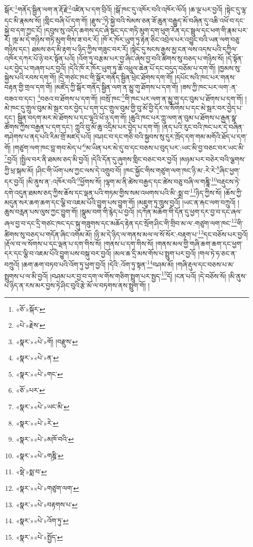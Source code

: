 སྒོར་\footnote{«ཅོ་»སྐོར་}གནོད་སྦྱིན་ལག་ན་རྡོ་རྗེ་\footnote{«པེ་»རྗེས་}འཛིན་པ་དག་བྲིའོ། །སྒོ་ཁང་དུ་འཁོར་བའི་འཁོར་ལོའོ། །ཆ་ལྔ་པར་བྱའོ། །སྟེང་དུ་ལྷ་དང་མི་རྣམས་སོ། །གླིང་བཞི་པོ་དག་གོ། །རྫུས་\footnote{«སྣར་»«པེ་»གོ། །བརྫུས་}ཏེ་སྐྱེ་བའི་སེམས་ཅན་ཟོ་ཆུན་བརྒྱུད་མོ་བཞིན་དུ་འཆི་འཕོ་བ་དང་སྐྱེ་བ་དག་ཀྱང་ངོ། །དབུས་སུ་འདོད་ཆགས་དང་ཞེ་སྡང་དང་གཏི་མུག་དག་ཕུག་རོན་དང་སྦྲུལ་དང་ཕག་གི་རྣམ་པར་རོ། །སྔ་མ་དེ་གཉིས་གཏི་མུག་གིས་ཟ་བར་རོ། །ཁོ་ར་ཁོར་ཡུག་ཏུ་རྟེན་ཅིང་འབྲེལ་པར་འབྱུང་བའི་ཡན་ལག་བཅུ་གཉིས་དང་། ཐམས་ཅད་མི་རྟག་པ་ཉིད་ཀྱིས་གཟུང་བར་རོ། །སྟེང་དུ་སངས་རྒྱས་མྱ་ངན་ལས་འདས་པའི་དཀྱིལ་འཁོར་དཀར་པོ་ཉེ་བར་སྟོན་པའོ། །འོག་ཏུ་བརྩམ་པར་བྱ་ཞིང་ཞེས་བྱ་བའི་ཚིགས་སུ་བཅད་པ་གཉིས་སོ། །དེ་སྟོན་པར་བྱེད་པ་གཞག་པར་བྱའོ། །དེའི་ཁོ་ར་ཁོར་ཡུག་ཏུ་ཆོ་འཕྲུལ་ཆེན་པོ་དང་བདུད་བཅོམ་པ་དག་གོ། །ཁྱམས་སུ་སྐྱེས་པའི་རབས་དག་གོ། །དྲི་གཙང་ཁང་གི་སྒོར་གནོད་སྦྱིན་ཕྲེང་ཐོགས་དག་གོ། །དཔོང་སའི་ཁང་པར་གནས་བརྟན་གྱི་གྲལ་དག་གོ། །མཛོད་ཀྱི་སྒོར་གནོད་སྦྱིན་ལག་ན་མྱུ་གུ་ཐོགས་པ་དག་གོ། །ཟས་ཀྱི་ཁང་པར་ལག་:ན་བཟའ་བ་དང་། \footnote{«སྣར་»«པེ་»ན་}བཅའ་བ་ཐོགས་པ་དག་གོ། །བསྲོ་ཁང་\footnote{«སྣར་»«པེ་»གང་}གི་ཁང་པར་ལག་ན་མྱུ་གུ་དང་བུམ་པ་ཐོགས་པ་དག་གོ། །མེ་ཁང་དུ་གྲུལ་བུམ་མེ་སྦར་བར་བྱེད་པ་དག་དང་གྲུལ་བུམ་གྱི་བུ་མོ་བྱི་དོར་ལ་སོགས་པ་དང་མེ་སྦར་བར་བྱེད་པ་དང་། སྦྱིན་བདག་མར་མེ་ཐོགས་པ་དང་ལྷའི་ཕོ་ཉ་དག་གོ། །ཆུའི་ཁང་པར་ཀླུ་ལག་ན་བུམ་པ་ཐོགས་པ་རྒྱན་སྣ་ཚོགས་ཀྱིས་བརྒྱན་པ་དག་དང་། ཀླུའི་བུ་མོ་ཆུ་འདྲིམ་པར་བྱེད་པ་དག་གོ། །ནད་པའི་རུང་བའི་ཁང་པར་དེ་བཞིན་གཤེགས་པ་ནད་པའི་རིམ་གྲོ་མཛད་པའོ། །བཤང་བ་དང་གཅི་བའི་སྐྱབས་སུ་དུར་ཁྲོད་དག་གམ་མགོའི་ཐོད་པ་དག་གོ། །གཙུག་ལག་ཁང་བླ་གབ་མེད་པ་\footnote{«ཅོ་»པར་}མ་ཡིན་པར་མེ་དུ་བ་དང་བཅས་པ་བུད་པར་:ཡང་མི་བྱ་བཅང་བར་ཡང་མི་\footnote{«སྣར་»«པེ་»ཡང་མི་}བྱའོ། །སྤྱིལ་བར་ནི་ཐམས་ཅད་མི་བྱའོ། །དེའི་དོན་དུ་ཞུགས་གླིང་བཅང་བར་བྱའོ། །མཉམ་པར་བཅེར་བའི་ལྕགས་ཀྱི་ཕྲ་སྐམ་མོ། །ཤིང་གི་ཡོག་པས་ཀྱང་ལས་དེ་འགྲུབ་བོ། །ཁང་སྐྱོང་གིས་གཙུག་ལག་ཁང་ཉི་མ་:རེ་རེ་\footnote{«སྣར་»«པེ་»རེ་}ཞིང་ཕྱག་དར་བྱའོ། །མི་ནུས་ན་:འཁོར་བའི་\footnote{«སྣར་»«པེ་»མཁོ་བའི་}ཕྱོགས་སོ། །ལྷག་མ་ནི་ཚེས་བརྒྱད་དང་ཚེས་བཅུ་བཞི་ལ་གཎྜཱི་\footnote{«སྣར་»«པེ་»གཎྜི་}བརྡུངས་ཏེ་དགེ་འདུན་ཐམས་ཅད་ཀྱིས་ཆོས་དང་ལྡན་པའི་གཏམ་གྱིས་སམ་འཕགས་པའི་མི་:སྨྲ་བ་\footnote{«སྡེ་»སྨ་བ་}ཉིད་ཀྱིས་སོ། །ཆོས་ཀྱི་མདུན་སར་ཆག་ཆག་དང་ལྕི་བ་འཇམ་པོའི་བྱུག་པས་བྱུག་གོ། །མཇུག་ཏུ་ཁྲུས་བྱའོ། །ཡང་ན་རྐང་ལག་བཀྲུའོ། །ཆུས་བརླན་པས་ལུས་ཀྱང་བྱུག་གོ། །སྣུམ་བག་གི་རྙེད་པ་བྱའོ། །དཀོན་མཆོག་གི་དོན་དུ་ཕྱག་དར་བྱ་བ་དང་ཞལ་ཞལ་བྱ་བ་དང་དྲི་གཙང་ཁང་དང་སྐུ་གཟུགས་དང་མཆོད་རྟེན་དང་སྲོག་ཤིང་གི་གྲིབ་མ་ལ་:གཙུག་ལག་ཁང་\footnote{«སྣར་»«པེ་»གཙུག་ལག་}གི་ཚིགས་སུ་བཅད་པ་གདོན་ཞིང་འགོམ་མོ། །ཉི་མ་དེ་ཉིད་ལ་གནས་མལ་ལ་སོ་སོར་:བརྟག་པ་\footnote{«སྣར་»«པེ་»བརྟགས་པ་}དང་བཅོས་པར་བྱའོ། །རྡོལ་བ་ལ་སོགས་པ་དང་ལྡན་པ་དག་གིས་སོ། །གནས་པ་དག་གིས་སོ། །གནས་མལ་གྱི་གཞི་ཆག་ཆག་དང་ཕྱག་དར་དང་ལྕི་བ་འཇམ་པོའི་བྱུག་པས་བསྐུ་བར་བྱའོ། །མལ་ཆ་དྲི་མས་གོས་པ་སྤྲུག་པར་བྱའོ། །གལ་ཏེ་ཧ་ཅང་ན་བཀྲུའོ། །ཆག་ཆག་བཏབ་པའི་འོག་ཏུ་ཕྱག་བྱའོ། །དེའི་:འོག་ཏུ་སྟན་\footnote{«སྣར་»«པེ་»འོག་ཏུ་}བཤམ་མོ། །གཞི་རྡུལ་དང་བཅས་པ་མ་སྤྲུགས་པ་ལ་མི་བྱའོ། །བཤམ་པར་བྱ་བ་དག་ལ་གོས་གཅིག་སྤྲུག་པར་སྤྱད་\footnote{«སྣར་»«པེ་»སྤྱོད་}དོ། །ངན་པའོ། །དེ་བཅོས་སོ། །མི་ནུས་པ་ཉིད་ན་རས་མར་བྱས་ཏེ་ཤིང་བུའི་རྩེ་མོ་ལ་བཏགས་ནས་སྤྲུག་གོ། །
